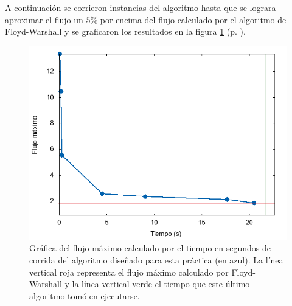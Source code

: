 \documentclass{article}
\begin{document}
  A continuación se corrieron instancias del algoritmo hasta que se lograra aproximar el flujo un $5$\% por encima del flujo calculado por el algoritmo de Floyd-Warshall y se graficaron los resultados en la figura \ref{flujo} (p. \pageref{flujo}).

  \begin{figure}[h]
    \includegraphics[width=1\textwidth]{flujo}
    \centering
    \caption{Gráfica del flujo máximo calculado por el tiempo en segundos de corrida del algoritmo diseñado para esta práctica (en azul). La línea vertical roja representa el flujo máximo calculado por Floyd-Warshall y la línea vertical verde el tiempo que este último algoritmo tomó en ejecutarse.}
    \label{flujo}
  \end{figure}

  {}
  
\end{document}
